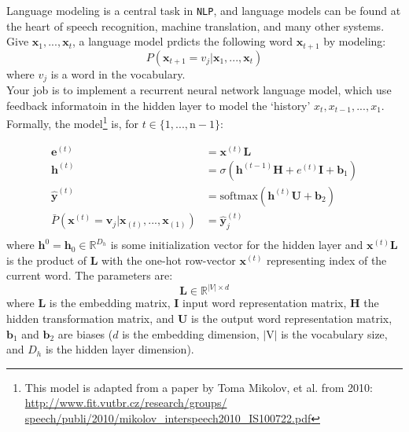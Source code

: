 \documentclass[letter,12pt]{article}
\begin{document}
\noindent Language modeling is a central task in \texttt{NLP}, and language models can be found at the heart of speech recognition, machine translation, and many other systems. Give ${\boldsymbol x}_{1}, ..., {\boldsymbol x}_{t}$, a language model prdicts the following word ${\boldsymbol x}_{t+1}$ by modeling:\\
\begin{equation}
P({\boldsymbol x}_{t+1} = v_{j} | {\boldsymbol x}_{1}, ..., {\boldsymbol x}_{t})
\end{equation}
where $v_{j}$ is a word in the vocabulary.\\

\noindent Your job is to implement a recurrent neural network language model, which use feedback informatoin in the hidden layer to model the `history' $x_{t}, x_{t-1}, ..., x_{1}$. Formally, the model\footnote{This model is adapted from a paper by Toma Mikolov, et al. from 2010: \url{http://www.fit.vutbr.cz/research/groups/
speech/publi/2010/mikolov_interspeech2010_IS100722.pdf}} is, for $t\in\{1,...,\textrm{n}-1\}$:

\begin{align}
{\boldsymbol e}^{(t)}       &= {\boldsymbol x}^{(t)}{\boldsymbol L} \\
{\boldsymbol h}^{(t)}       &= \sigma({\boldsymbol h}^{(t-1)}{\boldsymbol H} + {e}^{(t)}{\boldsymbol I} + {\boldsymbol b}_{1})\\
{\hat{\boldsymbol y}}^{(t)} &= \textrm{softmax}({\boldsymbol h}^{(t)}{\boldsymbol U} + {\boldsymbol b}_{2}) \\
\bar{P}({\boldsymbol x}^{(t)} = {\boldsymbol v}_{j} | {\boldsymbol x}_{(t)}, ..., {\boldsymbol x}_{(1)}) &= {\hat{\boldsymbol y}}^{(t)}_{j} \\
\end{align}
\noindent where ${\boldsymbol h}^{0} = {\boldsymbol h}_{0}\in\mathbb{R}^{D_{h}}$ is some initialization vector for the hidden layer and ${\boldsymbol x}^{(t)}{\boldsymbol L}$ is the product of ${\boldsymbol L}$ with the one-hot row-vector ${\boldsymbol x}^{(t)}$ representing index of the current word. The parameters are:
\begin{equation}
\boldsymbol L\in\mathbb{R}^{|V|\times{d}}\label{eq:dimensions questions 3a}
\end{equation}
\noindent where ${\boldsymbol L}$ is the embedding matrix, ${\boldsymbol I}$ input word representation matrix, ${\boldsymbol H}$ the hidden transformation matrix, and ${\boldsymbol U}$ is the output word representation matrix, ${\boldsymbol b}_{1}$ and ${\boldsymbol b}_{2}$ are biases ($d$ is the embedding dimension, $|\textrm{V}|$ is the vocabulary size, and $D_{h}$ is the hidden layer dimension). \\
\end{document}
